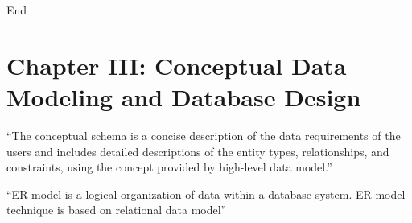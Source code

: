 \documentclass[10pt]{article}
\newcommand{\quotes}[1]{``#1''}
\begin{document}
\bigbreak
\begin{center}
	End
\end{center}
\pagebreak

\section*{Chapter III: Conceptual Data Modeling and Database Design}

\quotes{The conceptual schema is a concise description of the data requirements of the users and includes detailed descriptions of the entity types, relationships, and constraints, using the concept provided by high-level data model.}

\quotes{ER model is a logical organization of data within a database system. ER model technique is based on relational data model}
\end{document}
